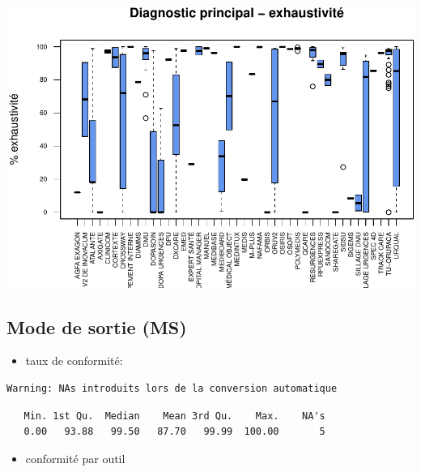 \documentclass[]{article}
\begin{document}
\includegraphics{septembre2015_files/figure-latex/unnamed-chunk-21-1.pdf}

\subsection{Mode de sortie (MS)}\label{mode-de-sortie-ms}

\begin{itemize}
\itemsep1pt\parskip0pt
\item
  taux de conformité:
\end{itemize}

\begin{verbatim}
Warning: NAs introduits lors de la conversion automatique
\end{verbatim}

\begin{verbatim}
   Min. 1st Qu.  Median    Mean 3rd Qu.    Max.    NA's 
   0.00   93.88   99.50   87.70   99.99  100.00       5 
\end{verbatim}

\begin{itemize}
\itemsep1pt\parskip0pt
\item
  conformité par outil
\end{itemize}
\end{document}
